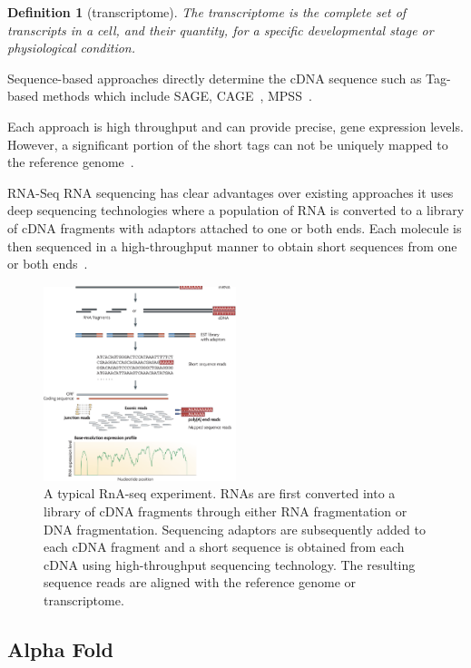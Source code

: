 \documentclass{report}
\newtheorem{definition}{Definition}[section]
\begin{document}
\begin{definition}[transcriptome]
    The transcriptome is the complete set of transcripts in a cell, and their quantity, for a specific developmental stage or physiological condition. 
\end{definition}

Sequence-based approaches directly determine the cDNA sequence such as Tag-based methods which include SAGE, CAGE~\cite{kodzius_cage_2006}, MPSS~\cite{reinartz_massively_2002}.

Each approach is high throughput and can provide precise, gene expression levels. However, a significant portion of the short tags can not be uniquely mapped to the reference genome~\cite{wang_rna-seq_2009}.

RNA-Seq RNA sequencing has clear advantages over existing approaches it uses deep sequencing technologies where a population of RNA is converted to a library of cDNA fragments with adaptors attached to one or both ends. Each molecule is then sequenced in a high-throughput manner to obtain short sequences from one or both ends~\cite{wang_rna-seq_2009}.

\begin{figure}[H]
    \centering
    \includegraphics[width=0.5\textwidth]{RNAseq.png}
    \caption{\label{fig:RNAseq}A typical RnA-seq experiment. RNAs are first converted into a library of cDNA fragments through either RNA fragmentation or DNA fragmentation. Sequencing adaptors are subsequently added to each cDNA fragment and a short sequence is obtained from each cDNA using high-throughput sequencing technology. The resulting sequence reads are aligned with the reference genome or transcriptome.}
\end{figure}

\subsection{Alpha Fold}
\end{document}
